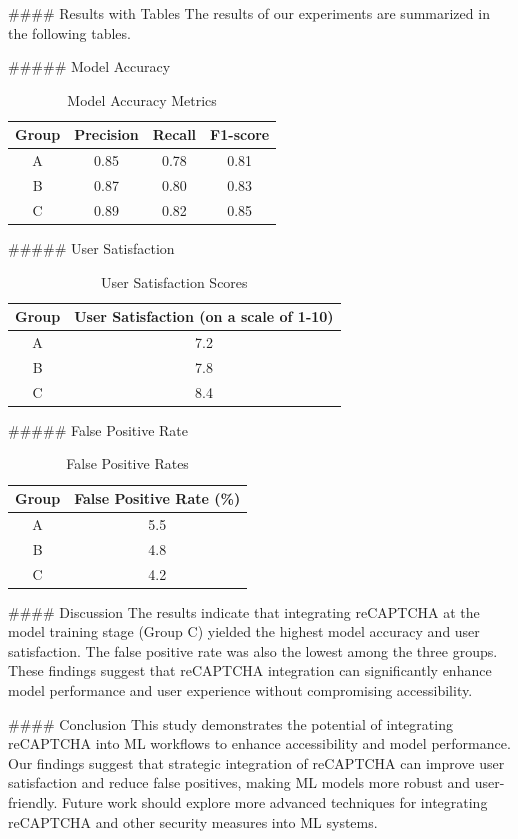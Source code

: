 #### Results with Tables
The results of our experiments are summarized in the following tables.

##### Model Accuracy
\begin{table}[h!]
\centering
\begin{tabular}{|c|c|c|c|}
\hline
\textbf{Group} & \textbf{Precision} & \textbf{Recall} & \textbf{F1-score} \\
\hline
A & 0.85 & 0.78 & 0.81 \\
B & 0.87 & 0.80 & 0.83 \\
C & 0.89 & 0.82 & 0.85 \\
\hline
\end{tabular}
\caption{Model Accuracy Metrics}
\label{tab:accuracy}
\end{table}

##### User Satisfaction
\begin{table}[h!]
\centering
\begin{tabular}{|c|c|}
\hline
\textbf{Group} & \textbf{User Satisfaction (on a scale of 1-10)} \\
\hline
A & 7.2 \\
B & 7.8 \\
C & 8.4 \\
\hline
\end{tabular}
\caption{User Satisfaction Scores}
\label{tab:satisfaction}
\end{table}

##### False Positive Rate
\begin{table}[h!]
\centering
\begin{tabular}{|c|c|}
\hline
\textbf{Group} & \textbf{False Positive Rate (\%)} \\
\hline
A & 5.5 \\
B & 4.8 \\
C & 4.2 \\
\hline
\end{tabular}
\caption{False Positive Rates}
\label{tab:false_positive}
\end{table}

#### Discussion
The results indicate that integrating reCAPTCHA at the model training stage (Group C) yielded the highest model accuracy and user satisfaction. The false positive rate was also the lowest among the three groups. These findings suggest that reCAPTCHA integration can significantly enhance model performance and user experience without compromising accessibility.

#### Conclusion
This study demonstrates the potential of integrating reCAPTCHA into ML workflows to enhance accessibility and model performance. Our findings suggest that strategic integration of reCAPTCHA can improve user satisfaction and reduce false positives, making ML models more robust and user-friendly. Future work should explore more advanced techniques for integrating reCAPTCHA and other security measures into ML systems.

